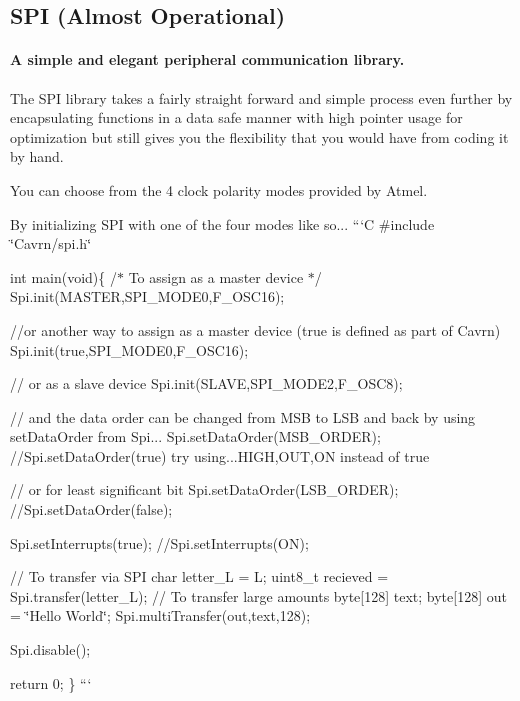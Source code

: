  \subsection*{S\+P\+I (Almost Operational)}

\paragraph*{A simple and elegant peripheral communication library.}

The S\+P\+I library takes a fairly straight forward and simple process even further by encapsulating functions in a data safe manner with high pointer usage for optimization but still gives you the flexibility that you would have from coding it by hand.

You can choose from the 4 clock polarity modes provided by Atmel. 

By initializing S\+P\+I with one of the four modes like so... ```\+C \#include \char`\"{}\+Cavrn/spi.\+h\char`\"{}

int main(void)\{ /$\ast$ To assign as a master device $\ast$/ Spi.\+init(\+M\+A\+S\+T\+E\+R,\+S\+P\+I\+\_\+\+M\+O\+D\+E0,\+F\+\_\+\+O\+S\+C16);

//or another way to assign as a master device (true is defined as part of Cavrn) Spi.\+init(true,\+S\+P\+I\+\_\+\+M\+O\+D\+E0,\+F\+\_\+\+O\+S\+C16);

// or as a slave device Spi.\+init(\+S\+L\+A\+V\+E,\+S\+P\+I\+\_\+\+M\+O\+D\+E2,\+F\+\_\+\+O\+S\+C8);

// and the data order can be changed from M\+S\+B to L\+S\+B and back by using set\+Data\+Order from Spi... Spi.\+set\+Data\+Order(\+M\+S\+B\+\_\+\+O\+R\+D\+E\+R); //\+Spi.set\+Data\+Order(true) try using...H\+I\+G\+H,O\+U\+T,O\+N instead of true

// or for least significant bit Spi.\+set\+Data\+Order(\+L\+S\+B\+\_\+\+O\+R\+D\+E\+R); //\+Spi.set\+Data\+Order(false);

Spi.\+set\+Interrupts(true); //\+Spi.set\+Interrupts(\+O\+N);

// To transfer via S\+P\+I char letter\+\_\+\+L = \textquotesingle{}L\textquotesingle{}; uint8\+\_\+t recieved = Spi.\+transfer(letter\+\_\+\+L); // To transfer large amounts byte\mbox{[}128\mbox{]} text; byte\mbox{[}128\mbox{]} out = \char`\"{}\+Hello World\char`\"{}; Spi.\+multi\+Transfer(out,text,128);

Spi.\+disable();

return 0; \} ``` 

